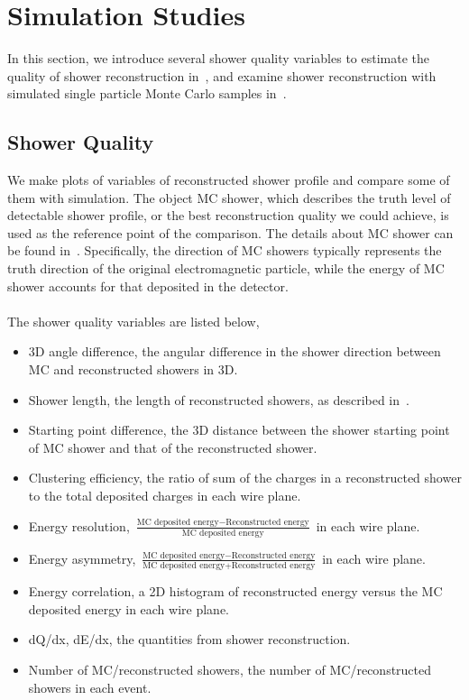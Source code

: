 \section{Simulation Studies}
\label{sec:mc}

In this section, we introduce several shower quality variables to estimate
the quality of shower reconstruction in~, and examine
shower reconstruction with simulated single particle Monte Carlo samples
in~.

\subsection{Shower Quality}
\label{sec:shr_quality}

We make plots of variables of reconstructed shower profile and compare
some of them with simulation.
The object MC shower, which describes the truth level of detectable shower
profile, or the best reconstruction quality we could achieve, 
is used as the reference point of the comparison.
The details about MC shower can be found in~\cite{DocDB3771}.
Specifically, the direction of MC showers typically represents the truth 
direction of the original electromagnetic particle, while the energy of
MC shower accounts for that deposited in the detector.\\
\\
The shower quality variables are listed below,
\begin{itemize}
\item 3D angle difference, the angular difference in the shower direction 
      between
      MC and reconstructed showers in 3D.
\item Shower length, the length of reconstructed showers, as described
      in~.
\item Starting point difference, the 3D distance between the shower
      starting point of MC shower and that of the reconstructed shower.
\item Clustering efficiency, the ratio of sum of the charges
      in a reconstructed shower to the total deposited charges in
      each wire plane.
\item Energy resolution, $\frac{\textrm{MC deposited energy}-\textrm{Reconstructed energy}}{\textrm{MC deposited energy}}$ in each wire plane.
\item Energy asymmetry, $\frac{\textrm{MC deposited energy}-\textrm{Reconstructed energy}}{\textrm{MC deposited energy}+\textrm{Reconstructed energy}}$ in each wire plane.
\item Energy correlation, a 2D histogram of reconstructed energy versus 
      the MC deposited energy in each wire plane.
\item dQ/dx, dE/dx, the quantities from shower reconstruction.
\item Number of MC/reconstructed showers, the number of MC/reconstructed
      showers in each event.
\end{itemize}

